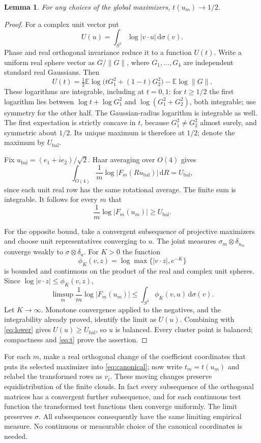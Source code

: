 \documentclass[11pt]{article}
\newtheorem{lemma}[theorem]{Lemma}
\theoremstyle{remark}
\newcommand{\E}{\mathbb E}
\newcommand{\dd}{\,\mathrm d}
\begin{document}
\begin{lemma}\label{lem:balance}
For any choices of the global maximizers, $t(u_m)\longrightarrow1/2$.
\end{lemma}
\begin{proof}
For a complex unit vector put
\[
 U(u)=\int_{S^3}\log|v\cdot u|\dd\sigma(v).
\]
Phase and real orthogonal invariance reduce it to a function $U(t)$. Write a uniform real sphere vector as $G/\|G\|$, where $G_1,\ldots,G_4$ are independent standard real Gaussians. Then
\begin{equation}\label{eq:potential}
 U(t)=\tfrac12\E\log\bigl(tG_1^2+(1-t)G_2^2\bigr)-\E\log\|G\|.
\end{equation}
These logarithms are integrable, including at $t=0,1$: for $t\geq1/2$ the first logarithm lies between $\log t+\log G_1^2$ and $\log(G_1^2+G_2^2)$, both integrable; use symmetry for the other half. The Gaussian-radius logarithm is integrable as well. The first expectation is strictly concave in $t$, because $G_1^2\ne G_2^2$ almost surely, and symmetric about $1/2$. Its unique maximum is therefore at $1/2$; denote the maximum by $U_{\mathrm{bal}}$.

Fix $u_{\mathrm{bal}}=(e_1+ie_2)/\sqrt2$. Haar averaging over $O(4)$ gives
\[
 \int_{O(4)}\frac1m\log|F_m(Ru_{\mathrm{bal}})|\dd R=U_{\mathrm{bal}},
\]
since each unit real row has the same rotational average. The finite sum is integrable. It follows for every $m$ that
\begin{equation}\label{eq:lower}
 \frac1m\log|F_m(u_m)|\geq U_{\mathrm{bal}}.
\end{equation}

For the opposite bound, take a convergent subsequence of projective maximizers and choose unit representatives converging to $u$. The joint measures $\sigma_m\otimes\delta_{u_m}$ converge weakly to $\sigma\otimes\delta_u$. For $K>0$ the function
\[
 \phi_K(v,z)=\log\max\{|v\cdot z|,e^{-K}\}
\]
is bounded and continuous on the product of the real and complex unit spheres. Since $\log|v\cdot z|\leq\phi_K(v,z)$,
\[
 \limsup_m\frac1m\log|F_m(u_m)|
       \leq\int_{S^3}\phi_K(v,u)\dd\sigma(v).
\]
Let $K\to\infty$. Monotone convergence applied to the negatives, and the integrability already proved, identify the limit as $U(u)$. Combining with \eqref{eq:lower} gives $U(u)\geq U_{\mathrm{bal}}$, so $u$ is balanced. Every cluster point is balanced; compactness and \eqref{eq:t} prove the assertion.
\end{proof}

For each $m$, make a real orthogonal change of the coefficient coordinates that puts its selected maximizer into \eqref{eq:canonical}; now write $t_m=t(u_m)$ and relabel the transformed rows as $v_i$. These moving changes preserve equidistribution of the finite clouds. In fact every subsequence of the orthogonal matrices has a convergent further subsequence, and for each continuous test function the transformed test functions then converge uniformly. The limit preserves $\sigma$. All subsequences consequently have the same limiting empirical measure. No continuous or measurable choice of the canonical coordinates is needed.
\end{document}
